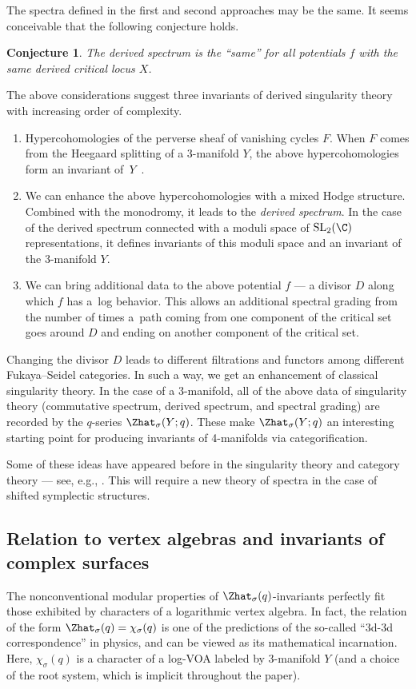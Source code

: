 \documentclass[10pt,a4paper]{amsart}
\newtheorem{Conjecture}[Theorem]{Conjecture}
 { \theoremstyle{definition}
\newtheorem{Definition}[Theorem]{Definition}
\newtheorem{Note}[Theorem]{Note}
\newtheorem{Example}[Theorem]{Example}
\newtheorem{Remark}[Theorem]{Remark}
\newtheorem{Question}[Theorem]{Question}
}
\begin{document}
The spectra defined in the first and second approaches may be the same. It seems conceivable that the following conjecture holds.

\begin{Conjecture}
	The derived spectrum is the ``same'' for all potentials $f$ with the same derived critical locus $X$.
\end{Conjecture}

The above considerations suggest three invariants of derived singularity theory with increasing order of complexity.
\begin{enumerate}\itemsep=0pt
	\item[(1)] Hypercohomologies of the perverse sheaf of vanishing cycles $F$. When $F$ comes from the Heegaard splitting of a 3-manifold $Y$, the above hypercohomologies form an invariant of~$Y$~\cite{AbMa20}.

	\item[(2)] We can enhance the above hypercohomologies with a mixed Hodge structure. Combined with the monodromy, it leads to the \emph{derived spectrum}. In the case of the derived spectrum connected with a moduli space of $\operatorname{SL}_2(\C)$ representations, it defines invariants of this moduli space and an invariant of the 3-manifold $Y$.

	\item[(3)] We can bring additional data to the above potential $f$ --- a divisor $D$ along which $f$ has a~log behavior. This allows an additional spectral grading from the number of times a~path coming from one component of the critical set goes around $D$ and ending on another component of the critical set.
\end{enumerate}

Changing the divisor $D$ leads to different filtrations and functors among different Fukaya--Seidel categories.
In such a way, we get an enhancement of classical singularity theory. In the case of a 3-manifold, all of the above data of singularity theory (commutative spectrum, derived spectrum, and spectral grading) are recorded by the $q$-series $\Zhat_{\sigma} (Y;q)$. These make $\Zhat_{\sigma} (Y;q)$ an interesting starting point for producing invariants of 4-manifolds via categorification.

Some of these ideas have appeared before in the singularity theory and category theory --- see, e.g., \cite{FichYin18,Kuz09}. This will require a new theory of spectra in the case of shifted symplectic structures.

\subsection{Relation to vertex algebras and invariants of complex surfaces}\label{sec:ADEVOA}
The nonconventional modular properties of $\Zhat_{\sigma} (q)$-invariants perfectly fit those exhibited by characters of a logarithmic vertex algebra. In fact, the relation of the form
$
	\Zhat_{\sigma} (q) = \chi_{\sigma} (q)
$
is one of the predictions of the so-called ``3d-3d correspondence'' in physics, and can be viewed as its mathematical incarnation. Here, $\chi_{\sigma} (q)$ is a character of a log-VOA labeled by 3-manifold $Y$ (and a choice of the root system, which is implicit throughout the paper).
\end{document}
